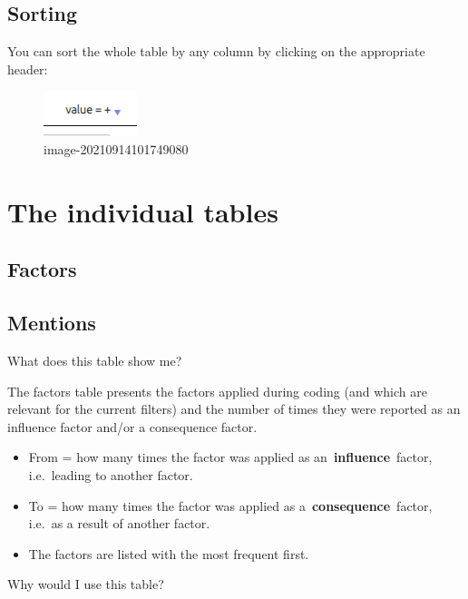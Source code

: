 \documentclass[
]{book}
\providecommand{\tightlist}{%
  \setlength{\itemsep}{0pt}\setlength{\parskip}{0pt}}
\begin{document}
\hypertarget{sorting}{%
\subsection{Sorting}\label{sorting}}

You can sort the whole table by any column by clicking on the appropriate header:

\begin{figure}
\centering
\includegraphics{_assets/image-20210914101749080.png}
\caption{image-20210914101749080}
\end{figure}

\hypertarget{the-individual-tables}{%
\section{The individual tables}\label{the-individual-tables}}

\hypertarget{factors}{%
\subsection{Factors}\label{factors}}

\hypertarget{mentions}{%
\subsection{Mentions}\label{mentions}}

What does this table show me?

The factors table presents the factors applied during coding (and which are relevant for the current filters) and the number of times they were reported as an influence factor and/or a consequence factor.

\begin{itemize}
\tightlist
\item
  From = how many times the factor was applied as an~\textbf{influence}~factor, i.e.~leading to another factor.
\item
  To = how many times the factor was applied as a~\textbf{consequence}~factor, i.e.~as a result of another factor.
\item
  The factors are listed with the most frequent first.
\end{itemize}

Why would I use this table?
\end{document}
